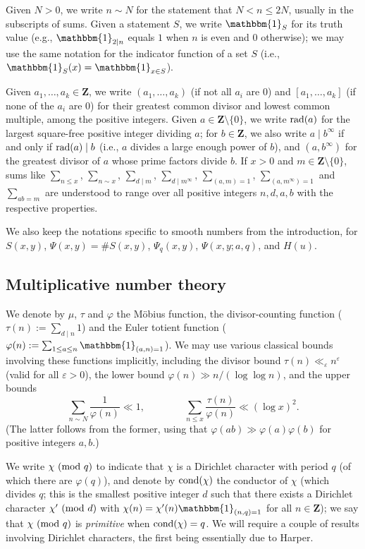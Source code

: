 \documentclass[reqno,11pt]{amsart}
\theoremstyle{definition}
\theoremstyle{remark}
\numberwithin{equation}{section}
\newcommand{\Z}{\mathbf{Z}}
\newcommand{\one}{\mathbbm{1}}
\newcommand{\eps}{\varepsilon}
\newcommand{\cond}{\textnormal{cond}}
\renewcommand{\pmod}[1]{\ (\textnormal{mod } #1)}
\newcommand{\rad}{\textnormal{rad}}
\begin{document}
Given $N > 0$, we write $n \sim N$ for the statement that $N < n \le 2N$, usually in the subscripts of sums. Given a statement $S$, we write $\one_S$ for its truth value (e.g., $\one_{2 \mid n}$ equals $1$ when $n$ is even and $0$ otherwise); we may use the same notation for the indicator function of a set $S$ (i.e., $\one_S(x) = \one_{x \in S}$). 

Given $a_1, \ldots, a_k \in \Z$, we write $(a_1, \ldots, a_k)$ (if not all $a_i$ are $0$) and $[a_1, \ldots, a_k]$ (if none of the $a_i$ are $0$) for their greatest common divisor and lowest common multiple, among the positive integers. 
Given $a \in \Z \setminus \{0\}$, we write $\rad(a)$ for the largest square-free positive integer dividing $a$; for $b \in \Z$, we also write $a \mid b^\infty$ if and only if $\rad(a) \mid b$ (i.e., $a$ divides a large enough power of $b$), and $(a, b^\infty)$ for the greatest divisor of $a$ whose prime factors divide $b$. If $x > 0$ and $m \in \Z \setminus \{0\}$, sums like $\sum_{n \le x}$, $\sum_{n \sim x}$, $\sum_{d \mid m}$, $\sum_{d \mid m^\infty}$, $\sum_{(a, m) = 1}$, $\sum_{(a, m^\infty) = 1}$ and $\sum_{ab = m}$ are understood to range over all positive integers $n, d, a, b$ with the respective properties. 

We also keep the notations specific to smooth numbers from the introduction, for $S(x, y)$, $\Psi(x, y) = \# S(x, y)$, $\Psi_q(x, y)$, $\Psi(x, y; a, q)$, and $H(u)$.


\subsection{Multiplicative number theory}

We denote by $\mu$, $\tau$ and $\varphi$ the M\"obius function, the divisor-counting function ($\tau(n) := \sum_{d \mid n} 1$) and the Euler totient function ($\varphi(n) := \sum_{1 \le a \le n} \one_{(a, n) = 1}$). We may use various classical bounds involving these functions implicitly, including the divisor bound $\tau(n) \ll_\eps n^\eps$ (valid for all $\eps > 0$), the lower bound $\varphi(n) \gg n/(\log \log n)$, and the upper bounds
\[
    \sum_{n \sim N} \frac{1}{\varphi(n)} \ll 1, \qquad\qquad 
    \sum_{n \le x} \frac{\tau(n)}{\varphi(n)} \ll (\log x)^2.
\]
(The latter follows from the former, using that $\varphi(ab) \gg \varphi(a) \varphi(b)$ for positive integers $a, b$.)

We write $\chi \pmod{q}$ to indicate that $\chi$ is a Dirichlet character with period $q$ (of which there are $\varphi(q)$), and denote by $\cond(\chi)$ the conductor of $\chi$ (which divides $q$; this is the smallest positive integer $d$ such that there exists a Dirichlet character $\chi' \pmod{d}$ with $\chi(n) = \chi'(n) \one_{(n, q) = 1}$ for all $n \in \Z$); we say that $\chi \pmod{q}$ is \emph{primitive} when $\cond(\chi) = q$. We will require a couple of results involving Dirichlet characters, the first being essentially due to Harper.
\end{document}
